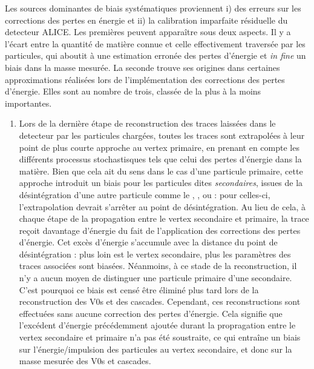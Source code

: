 Les sources dominantes de biais systématiques proviennent i) des erreurs sur les corrections des pertes en énergie et ii) la calibration imparfaite résiduelle du detecteur ALICE. Les premières peuvent apparaître sous deux aspects. Il y a l’écart entre la quantité de matière connue et celle effectivement traversée par les particules, qui aboutit à une estimation erronée des pertes d’énergie et \textit{in fine} un biais dans la masse mesurée. La seconde trouve ses origines dans certaines approximations réalisées lors de l'implémentation des corrections des pertes d'énergie. Elles sont au nombre de trois, classée de la plus à la moins importantes.
\begin{enumerate}
\item Lors de la dernière étape de reconstruction des traces laissées dans le detecteur par les particules chargées, toutes les traces sont extrapolées à leur point de plus courte approche au vertex primaire, en prenant en compte les différents processus stochastisques tels que celui des pertes d'énergie dans la matière. Bien que cela ait du sens dans le cas d'une particule primaire, cette approche introduit un biais pour les particules dites \textit{secondaires}, issues de la désintégration d'une autre particule comme le \rmKzeroS, \rmLambda, \rmXi ou \rmOmega : pour celles-ci, l'extrapolation devrait s'arrêter au point de désintégration. Au lieu de cela, à chaque étape de la propagation entre le vertex secondaire et primaire, la trace reçoit davantage d'énergie du fait de l'application des corrections des pertes d'énergie. Cet excès d'énergie s'accumule avec la distance du point de désintégration :  plus loin est le vertex secondaire, plus les paramètres des traces associées sont biasées. Néanmoins, à ce stade de la reconstruction, il n'y a aucun moyen de distinguer une particule primaire d'une secondaire. C'est pourquoi ce biais est censé être éliminé plus tard lors de la reconstruction des V0s et des cascades. Cependant, ces reconstructions sont effectuées sans aucune correction des pertes d'énergie. Cela signifie que l'excédent d'énergie précédemment ajoutée durant la propragation entre le vertex secondaire et primaire n'a pas été soustraite, ce qui entraîne un biais sur l'énergie/impulsion des particules au vertex secondaire, et donc sur la masse mesurée des V0s et cascades. 


\end{enumerate}
